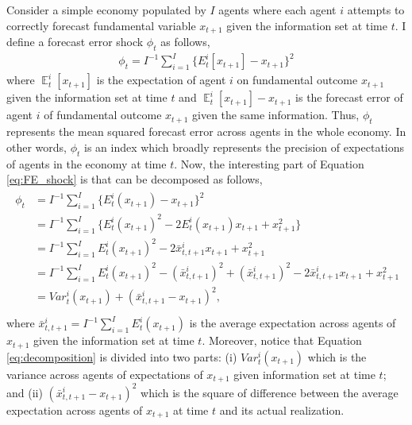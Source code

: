 \documentclass{article}
\DeclareMathOperator{\E}{\mathbb{E}}
\begin{document}
{Consider a simple economy populated by $I$ agents where each agent $i$ attempts to correctly forecast fundamental variable $x_{t+1}$ given the information set at time $t$. I define a forecast error shock $\phi_t$ as follows,
\begin{eqnarray}\label{eq:FE_shock}
\phi_t = I^{-1} \sum_{i=1}^I \big\{ E_t^i [ x_{t+1} ] - x_{t+1} \big\}^2 
\end{eqnarray}
where $\E^i_t [ x_{t+1} ]$ is the expectation of agent $i$ on fundamental outcome $x_{t+1}$ given the information set at time $t$ and $\E^i_t [ x_{t+1} ] - x_{t+1}$ is the forecast error of agent $i$ of fundamental outcome $x_{t+1}$ given the same information. Thus, $\phi_t$ represents the mean squared forecast error across agents in the whole economy. In other words, $\phi_t$ is an index which broadly represents the precision of expectations of agents in the economy at time $t$. Now, the interesting part of Equation \ref{eq:FE_shock} is that can be decomposed as follows,
\begin{eqnarray}\label{eq:decomposition}
\begin{aligned}
\phi_t &= I^{-1} \sum_{i=1}^I \big\{ E_t^i ( x_{t+1} ) - x_{t+1} \big\}^2 \\
&= I^{-1} \sum_{i=1}^I \big\{  E_t^i ( x_{t+1} )^2 - 2E_t^i ( x_{t+1} )x_{t+1} + x_{t+1}^2  \big\} \\
&= I^{-1} \sum_{i=1}^I E_t^i ( x_{t+1} )^2 - 2\bar{x}_{t,t+1}^i x_{t+1} + x_{t+1}^2 \\
&= I^{-1} \sum_{i=1}^I E_t^i ( x_{t+1} )^2 - (\bar{x}_{t,t+1}^i)^2 + (\bar{x}_{t,t+1}^i)^2 - 2\bar{x}_{t,t+1}^i x_{t+1} + x_{t+1}^2 \\
&= Var^i_t(x_{t+1}) + (\bar{x}_{t,t+1}^i - x_{t+1})^2, \\
\end{aligned}
\end{eqnarray}
where $\bar{x}_{t,t+1}^i = I^{-1} \sum_{i=1}^I E_t^i ( x_{t+1} )$ is the average expectation across agents of $x_{t+1}$ given the information set at time $t$. Moreover, notice that Equation \ref{eq:decomposition} is divided into two parts: (i) $Var^i_t(x_{t+1})$ which is the variance across agents of expectations of $x_{t+1}$ given information set at time $t$; and (ii) $(\bar{x}_{t,t+1}^i - x_{t+1})^2$ which is the square of difference between the average expectation across agents of $x_{t+1}$ at time $t$ and its actual realization.

}
\end{document}
